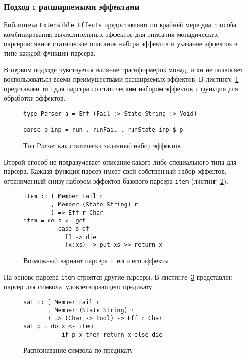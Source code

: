 \newpage

\subsubsection{Подход с расширяемыми эффектами}

Библиотека \lstinline{Extensible Effects} предоставляют по крайней мере два способа комбинирования вычислительных эффектов для описания монадических парсеров: явное статическое описание набора эффектов и указание эффектов в типе каждой функции парсера.

В первом подходе чувствуется влияние траснформеров монад, и он не позволяет воспользоваться всеми преимуществами расширяемых эффектов. В листинге~\ref{listing:ExtEffectsParser} представлен тип для парсера со статическим набором эффектов и функция для обработки эффектов.

\begin{figure}[h]
\begin{lstlisting}
type Parser a = Eff (Fail :> State String :> Void)

parse p inp = run . runFail . runState inp $ p
\end{lstlisting}
\caption{Тип Parser как статически заданный набор эффектов}
\label{listing:ExtEffectsParser}
\end{figure}

Второй способ не подразумевает описание какого-либо специального типа для парсера. Каждая функция-парсер имеет свой собственный набор эффектов, ограниченный снизу набором эффектов базового парсера \lstinline{item} (листинг~\ref{listing:ExtEffectsItem}).

\begin{figure}[h]
\begin{lstlisting}
item :: ( Member Fail r
        , Member (State String) r
        ) => Eff r Char
item = do s <- get
          case s of
            [] -> die
            (x:xs) -> put xs >> return x
\end{lstlisting}
\caption{Возможный вариант парсера \lstinline{item} и его эффекты}
\label{listing:ExtEffectsItem}
\end{figure}

На основе парсера \lstinline{item} строятся другие парсеры. В листинге~\ref{listing:ExtEffectsSat} представлен парсер для символа, удовлетворяющего предикату.

\begin{figure}[h]
\begin{lstlisting}
sat :: ( Member Fail r
       , Member (State String) r
       ) => (Char -> Bool) -> Eff r Char
sat p = do x <- item
           if p x then return x else die
\end{lstlisting}
\caption{Распознавание символа по предикату}
\label{listing:ExtEffectsSat}
\end{figure}


